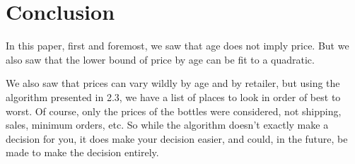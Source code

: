 \chapter{Conclusion}

In this paper, first and foremost, we saw that age does not imply price. But we also saw that the lower bound of price by age can be fit to a quadratic.

We also saw that prices can vary wildly by age and by retailer, but using the algorithm presented in 2.3, we have a list of places to look in order of best to worst. Of course, only the prices of the bottles were considered, not shipping, sales, minimum orders, etc. So while the algorithm doesn't exactly make a decision for you, it does make your decision easier, and could, in the future, be made to make the decision entirely.

